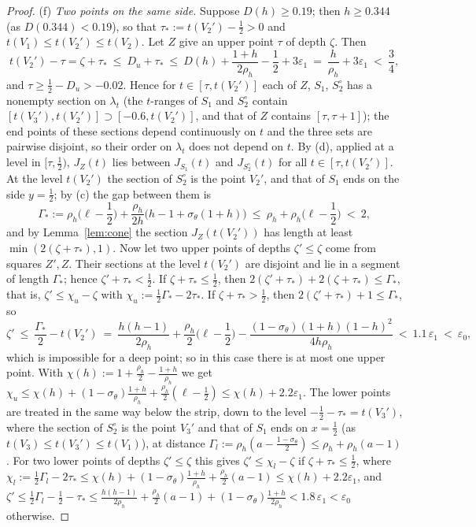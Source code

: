 \documentclass[11pt]{amsart}
\theoremstyle{definition}
\theoremstyle{remark}
\begin{document}
\begin{proof}
(f) \emph{Two points on the same side.} Suppose $D(h)\ge0.19$; then $h\ge0.344$ (as $D(0.344)<0.19$), so that
$\tau_*:=t(V_2')-\frac12>0$ and $t(V_1)\le t(V_2')\le t(V_2)$. Let $Z$ give an upper point $\tau$ of depth $\zeta$. Then
\[
t(V_2')-\tau=\zeta+\tau_*\ \le\ D_u+\tau_*\ \le\ D(h)+\frac{1+h}{2\rho_h}-\frac12+3\varepsilon_1\ =\ \frac h{\rho_h}+3\varepsilon_1\ <\ \frac34,
\]
and $\tau\ge\frac12-D_u>-0.02$. Hence for $t\in[\tau,t(V_2')]$ each of $Z$, $S_1$, $S_2^\circ$ has a nonempty section on $\lambda_t$ (the
$t$-ranges of $S_1$ and $S_2^\circ$ contain $[t(V_3'),t(V_2')]\supset[-0.6,t(V_2')]$, and that of $Z$ contains $[\tau,\tau+1]$); the end points
of these sections depend continuously on $t$ and the three sets are pairwise disjoint, so their order on $\lambda_t$ does not
depend on $t$. By (d), applied at a level in $[\tau,\frac12)$, $J_Z(t)$ lies between $J_{S_1}(t)$ and $J_{S_2^\circ}(t)$ for all
$t\in[\tau,t(V_2')]$. At the level $t(V_2')$ the section of $S_2^\circ$ is the point $V_2'$, and that of $S_1$ ends on the side $y=\frac12$;
by (c) the gap between them is
\[
\Gamma_*:=\rho_h\Big(\ell-\frac12\Big)+\frac{\rho_h}{2h}\big(h-1+\sigma_\theta(1+h)\big)\ \le\ \rho_h+\rho_h\Big(\ell-\frac12\Big)\ <\ 2,
\]
and by Lemma~\ref{lem:cone} the section $J_Z(t(V_2'))$ has length at least $\min(2(\zeta+\tau_*),1)$. Now let two upper points of depths
$\zeta'\le\zeta$ come from squares $Z',Z$. Their sections at the level $t(V_2')$ are disjoint and lie in a segment of length
$\Gamma_*$; hence $\zeta'+\tau_*<\frac12$. If $\zeta+\tau_*\le\frac12$, then $2(\zeta'+\tau_*)+2(\zeta+\tau_*)\le\Gamma_*$, that is,
$\zeta'\le\chi_u-\zeta$ with $\chi_u:=\frac12\Gamma_*-2\tau_*$. If $\zeta+\tau_*>\frac12$, then $2(\zeta'+\tau_*)+1\le\Gamma_*$, so
\[
\zeta'\ \le\ \frac{\Gamma_*}2-t(V_2')\ =\ \frac{h(h-1)}{2\rho_h}+\frac{\rho_h}2\Big(\ell-\frac12\Big)-\frac{(1-\sigma_\theta)(1+h)(1-h)^2}{4h\rho_h}
\ <\ 1.1\,\varepsilon_1\ <\ \varepsilon_0,
\]
which is impossible for a deep point; so in this case there is at most one upper point. With
$\chi(h):=1+\frac{\rho_h}2-\frac{1+h}{\rho_h}$ we get $\chi_u\le\chi(h)+(1-\sigma_\theta)\frac{1+h}{\rho_h}+\frac{\rho_h}2(\ell-\frac12)\le\chi(h)+2.2\varepsilon_1$.
The lower points are treated in the same way below the strip, down to the level $-\frac12-\tau_*=t(V_3')$, where the section of
$S_2^\circ$ is the point $V_3'$ and that of $S_1$ ends on $x=\frac12$ (as $t(V_3)\le t(V_3')\le t(V_1)$), at distance
$\Gamma_l:=\rho_h(a-\frac{1-\sigma_\theta}2)\le\rho_h+\rho_h(a-1)$. For two lower points of depths $\zeta'\le\zeta$ this gives
$\zeta'\le\chi_l-\zeta$ if $\zeta+\tau_*\le\frac12$, where $\chi_l:=\frac12\Gamma_l-2\tau_*\le\chi(h)+(1-\sigma_\theta)\frac{1+h}{\rho_h}+
\frac{\rho_h}2(a-1)\le\chi(h)+2.2\varepsilon_1$, and $\zeta'\le\frac12\Gamma_l-\frac12-\tau_*\le\frac{h(h-1)}{2\rho_h}+\frac{\rho_h}2(a-1)+
(1-\sigma_\theta)\frac{1+h}{2\rho_h}<1.8\,\varepsilon_1<\varepsilon_0$ otherwise.


\end{proof}
\end{document}

